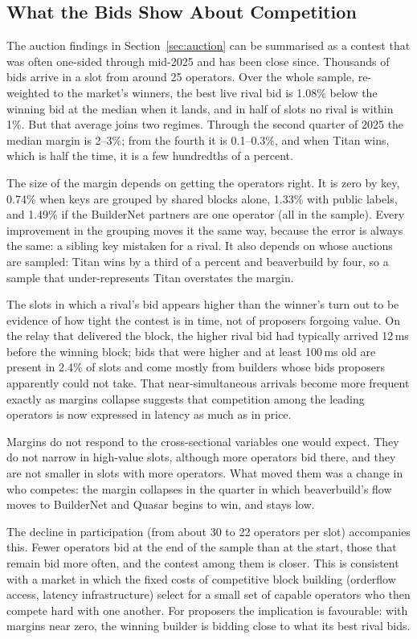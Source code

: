 \documentclass[11pt]{article}
\begin{document}
\subsection{What the Bids Show About Competition}
\label{sec:disc_efficiency}

The auction findings in Section~\ref{sec:auction} can be summarised as a
contest that was often one-sided through mid-2025 and has been close since.
Thousands of bids arrive in a slot from around 25 operators. Over the whole
sample, re-weighted to the market's winners, the best live rival bid is
1.08\% below the winning bid at the median when it lands, and in half of
slots no rival is within 1\%. But that average joins two regimes. Through
the second quarter of 2025 the median margin is 2--3\%; from the fourth it
is 0.1--0.3\%, and when Titan wins, which is half the time, it is a few
hundredths of a percent.

The size of the margin depends on getting the operators right. It is zero
by key, 0.74\% when keys are grouped by shared blocks alone, 1.33\% with
public labels, and 1.49\% if the BuilderNet partners are one operator (all
in the sample). Every improvement in the grouping moves it the same way,
because the error is always the same: a sibling key mistaken for a rival.
It also depends on whose auctions are sampled: Titan wins by a third of a
percent and beaverbuild by four, so a sample that under-represents Titan
overstates the margin.

The slots in which a rival's bid appears higher than the winner's turn out
to be evidence of how tight the contest is in time, not of proposers
forgoing value. On the relay that delivered the block, the higher rival bid
had typically arrived 12\,ms before the winning block; bids that were higher
and at least 100\,ms old are present in 2.4\% of slots and come mostly from
builders whose bids proposers apparently could not take. That
near-simultaneous arrivals become more frequent exactly as margins collapse
suggests that competition among the leading operators is now expressed in
latency as much as in price.

Margins do not respond to the cross-sectional variables one would expect.
They do not narrow in high-value slots, although more operators bid there,
and they are not smaller in slots with more operators. What moved them was
a change in who competes: the margin collapses in the quarter in which
beaverbuild's flow moves to BuilderNet and Quasar begins to win, and stays
low.

The decline in participation (from about 30 to 22 operators per slot)
accompanies this. Fewer operators bid at the end of the sample than at the
start, those that remain bid more often, and the contest among them is
closer. This is consistent with a market in which the fixed costs of
competitive block building (orderflow access, latency infrastructure)
select for a small set of capable operators who then compete hard with one
another. For proposers the implication is favourable: with margins near
zero, the winning builder is bidding close to what its best rival bids.
\end{document}
